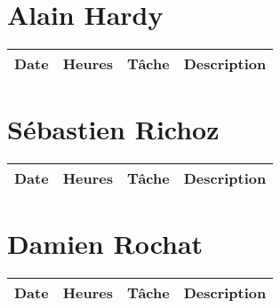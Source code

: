 \documentclass[french]{article}
\begin{document}
	\section*{Alain Hardy}
	\begin{tabular}{p{}|p{}|p{}|p{}}
		Date&Heures&Tâche&Description\\
		\hline
	\end{tabular}
	
	\section*{Sébastien Richoz}
	\begin{tabular}{p{}|p{}|p{}|p{}}
		Date&Heures&Tâche&Description\\
		\hline
	\end{tabular}
		
	\section*{Damien Rochat}
	\begin{tabular}{p{}|p{}|p{}|p{}}
		Date&Heures&Tâche&Description\\
		\hline
	\end{tabular}
				
\end{document}
